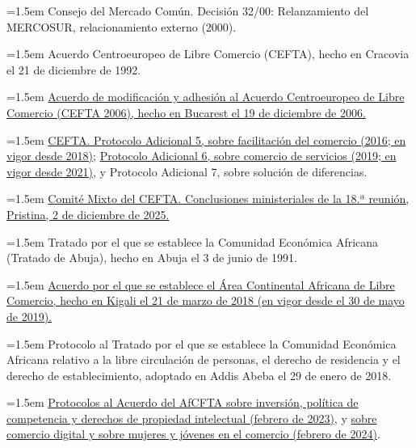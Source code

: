 \documentclass[10pt,a4paper]{article}
\begin{document}
\noindent\hangindent=1.5em Consejo del Mercado Común. Decisión 32/00: Relanzamiento del MERCOSUR, relacionamiento externo (2000).

\noindent\hangindent=1.5em Acuerdo Centroeuropeo de Libre Comercio (CEFTA), hecho en Cracovia el 21 de diciembre de 1992.

\noindent\hangindent=1.5em \href{https://cefta.int/wp-content/uploads/2021/07/CEFTAMAINTEXT2006.pdf}{Acuerdo de modificación y adhesión al Acuerdo Centroeuropeo de Libre Comercio (CEFTA 2006), hecho en Bucarest el 19 de diciembre de 2006.}

\noindent\hangindent=1.5em \href{https://cefta.int/wp-content/uploads/2021/07/Additional-Protocol-5.pdf}{CEFTA. Protocolo Adicional 5, sobre facilitación del comercio (2016; en vigor desde 2018)}; \href{https://www.cefta.int/wp-content/uploads/2021/07/Additional-Protocol-6-on-Trade-in-Services-.pdf}{Protocolo Adicional 6, sobre comercio de servicios (2019; en vigor desde 2021)}, y Protocolo Adicional 7, sobre solución de diferencias.

\noindent\hangindent=1.5em \href{https://cefta.int/wp-content/uploads/2025/12/Ministerial-conclusions_2-December-2025.pdf}{Comité Mixto del CEFTA. Conclusiones ministeriales de la 18.ª reunión, Pristina, 2 de diciembre de 2025.}

\noindent\hangindent=1.5em Tratado por el que se establece la Comunidad Económica Africana (Tratado de Abuja), hecho en Abuja el 3 de junio de 1991.

\noindent\hangindent=1.5em \href{https://au.int/en/treaties/agreement-establishing-african-continental-free-trade-area}{Acuerdo por el que se establece el Área Continental Africana de Libre Comercio, hecho en Kigali el 21 de marzo de 2018 (en vigor desde el 30 de mayo de 2019).}

\noindent\hangindent=1.5em Protocolo al Tratado por el que se establece la Comunidad Económica Africana relativo a la libre circulación de personas, el derecho de residencia y el derecho de establecimiento, adoptado en Addis Abeba el 29 de enero de 2018.

\noindent\hangindent=1.5em \href{https://au.int/sites/default/files/treaties/45078-treaty-EN_AfCFTA_Protocol_on_Investment.pdf}{Protocolos al Acuerdo del AfCFTA sobre inversión, política de competencia y derechos de propiedad intelectual (febrero de 2023)}, y \href{https://africanlii.org/akn/aa-au/act/protocol/2024/free_trade_area_on_digital_trade/eng@2024-02-18}{sobre comercio digital y sobre mujeres y jóvenes en el comercio (febrero de 2024)}.
\end{document}
